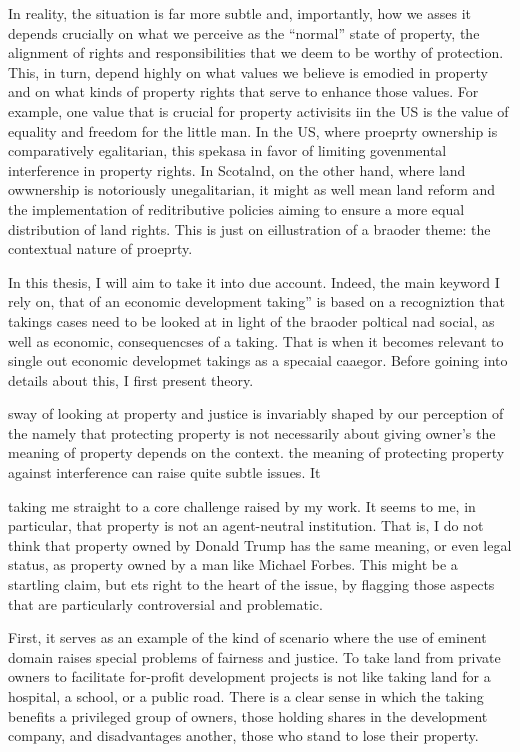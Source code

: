 In reality, the situation is far more subtle and, importantly, how we asses it depends crucially on what we perceive as the ``normal'' state of property, the alignment of rights and responsibilities that we deem to be worthy of protection. This, in turn, depend highly on what values we believe is emodied in property and on what kinds of property rights that serve to enhance those values. For example, one value that is crucial for property activisits iin the US is the value of equality and freedom for the little man. In the US, where proeprty ownership is comparatively egalitarian, this spekasa in favor of limiting govenmental interference in property rights. In Scotalnd, on the other hand, where land owwnership is notoriously unegalitarian, it might as well mean land reform and the implementation of reditributive policies aiming to ensure a more equal distribution of land rights. This is just on eillustration of a braoder theme: the contextual nature of proeprty.

In this thesis, I will aim to take it into due account. Indeed, the main keyword I rely on, that of an economic development taking''  is based on a recogniztion that takings cases need to be looked at in light of the braoder poltical nad social, as well as economic, consequencses of a taking. That is when it becomes relevant to single out economic developmet takings as a specaial caaegor. 
Before goining into details about this, I first present theory. 

sway of looking at property and justice is invariably shaped by our perception of the 
namely that protecting property is not necessarily about giving owner's 
the meaning of property depends on the context. 
the meaning of protecting property against interference can raise quite subtle issues. It 

taking me straight to a core challenge raised by my work. It seems to me, in particular, that property is not an agent-neutral institution. That is, I do not think that property owned by Donald Trump has the same meaning, or even legal status, as property owned by a man like Michael Forbes. This might be a startling claim, but 
ets right to the heart of the issue, by flagging those aspects that are particularly controversial and problematic. 



First, it  serves as an example of the kind of scenario where the use of eminent domain raises special problems of fairness and justice. To take land from private owners to facilitate for-profit development projects is not like taking land for a hospital, a school, or a public road. There is a clear sense in which the taking benefits a privileged group of owners, those holding shares in the development company, and disadvantages another, those who stand to lose their property. 

